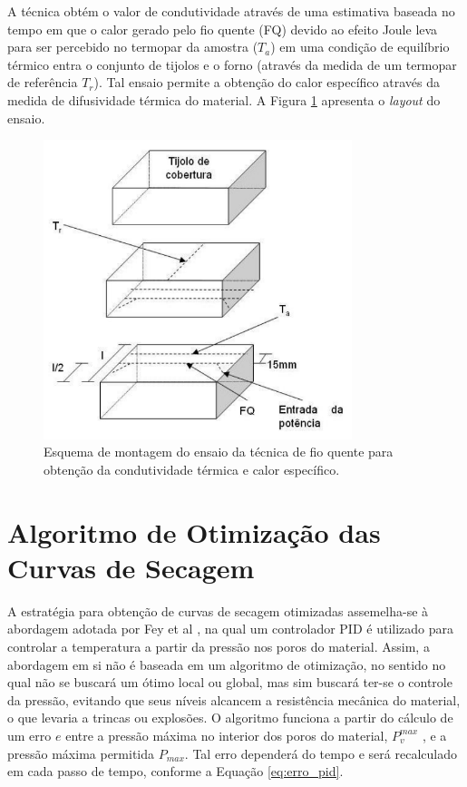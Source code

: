 A técnica obtém o valor de condutividade através de uma estimativa baseada no
tempo em que o calor gerado pelo fio quente (FQ) devido ao efeito Joule leva
para ser percebido no termopar da amostra ($T_a$) em uma condição de equilíbrio
térmico entra o conjunto de tijolos e o forno (através da medida de um termopar
de referência $T_r$). Tal ensaio permite a obtenção do calor específico através
da medida de difusividade térmica do material. A Figura \ref{fig:fio_quente}
apresenta o {\it layout} do ensaio.

\begin{figure}[!ht]
	\centering
	\includegraphics[width=9cm]{./figures/fio_quente.pdf}
	\caption{Esquema de montagem do ensaio da técnica de fio quente para obtenção
    da condutividade térmica e calor específico. \label{fig:fio_quente}}
\end{figure}

\section{Algoritmo de Otimização das Curvas de Secagem}\label{mat:pid}
A estratégia para obtenção de curvas de secagem otimizadas assemelha-se à
abordagem adotada por Fey et al \cite{Fey2017c}, na qual um controlador PID é
utilizado para controlar a temperatura a partir da pressão nos poros do
material. Assim, a abordagem em si não é baseada em um algoritmo de otimização,
no sentido no qual não se buscará um ótimo local ou global, mas sim buscará
ter-se o controle da pressão, evitando que seus níveis alcancem a resistência
mecânica do material, o que levaria a trincas ou explosões. O algoritmo funciona
a partir do cálculo de um erro $e$ entre a pressão máxima no interior dos poros
do material, $P_v^{max}$ , e a pressão máxima permitida $P_{max}$. Tal erro
dependerá do tempo e será recalculado em cada passo de tempo, conforme a Equação
\ref{eq:erro_pid}.

